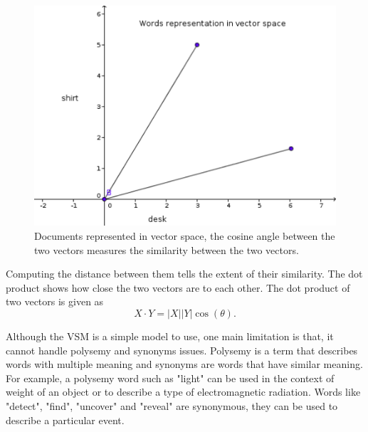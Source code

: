 \begin{figure}[hbtp]
\centering
\includegraphics[scale=0.5]{words_in_vs_orig.png}
\caption{Documents represented in vector space, the  cosine angle between the two vectors measures the similarity between the two vectors.}
\end{figure}
\label{figure 2.1}
Computing the distance between them tells the extent of their similarity. The dot product shows how close the two vectors are to each other. The dot product of two vectors is given as
$$X\cdot Y=|X||Y|\cos (\theta) \text{.}$$

Although the VSM is a simple model to use, one main limitation is that, it cannot handle polysemy and synonyms issues. Polysemy is a term that describes words with multiple meaning and synonyms are words that have similar meaning.
For example, a polysemy word such as "light" can be used in the context of weight of an object or to describe a type of electromagnetic radiation.
Words like "detect", "find", "uncover" and "reveal" are synonymous, they can be used to describe a particular event.

